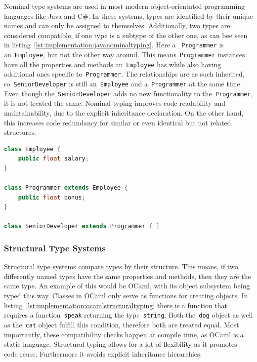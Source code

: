 Nominal type systems are used in most modern object-orientated programming languages like Java and C\#. In these systems, types are identified by their unique names and can only be assigned to themselves. Additionally, two types are considered compatible, if one type is a subtype of the other one, as can bee seen in listing~\ref{lst:implementation:javanominaltyping}. Here a ~\lstinline|Programmer| is an~\lstinline|Employee|, but not the other way around. This means~\lstinline|Programmer| instances have all the properties and methods an~\lstinline|Employee| has while also having additional ones specific to~\lstinline|Programmer|. The relationships are as such inherited, so~\lstinline|SeniorDeveloper| is still an~\lstinline|Employee| and a~\lstinline|Programmer| at the same time. Even though the~\lstinline|SeniorDeveloper| adds no new functionality to the~\lstinline|Programmer|, it is not treated the same. Nominal typing improves code readability and maintainability, due to the explicit inheritance declaration. On the other hand, this increases code redundancy for similar or even identical but not related structures.

\begin{lstlisting}[language=Java,caption=Example of nominal typing in Java,label=lst:implementation:javanominaltyping]
class Employee {
	public float salary;
}

class Programmer extends Employee {
	public float bonus;
}

class SeniorDeveloper extends Programmer { }
\end{lstlisting}

\subsubsection{Structural Type Systems}

Structural type systems compare types by their structure. This means, if two differently named types have the same properties and methods, then they are the same type. An example of this would be OCaml, with its object subsystem being typed this way. Classes in OCaml only serve as functions for creating objects. In listing~\ref{lst:implementation:ocamlstructuraltyping} there is a function that requires a function~\lstinline|speak| returning the type~\lstinline|string|. Both the~\lstinline|dog| object as well as the~\lstinline|cat| object fulfill this condition, therefore both are treated equal. Most importantly, these compatibility checks happen at compile time, as OCaml is a static language. Structural typing allows for a lot of flexibility as it promotes code reuse. Furthermore it avoids explicit inheritance hierarchies.

